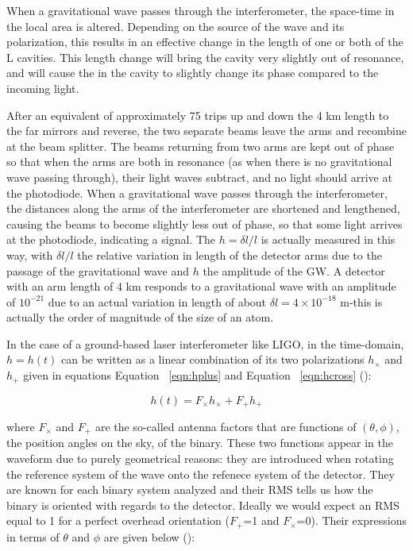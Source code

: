 \documentclass[epsf]{article}
\begin{document}
When a gravitational wave passes through the interferometer, the space-time in the local area is altered. Depending on the source of the wave and its polarization, this results in an effective change in the length of one or both of the L cavities. This length change will bring the cavity very slightly out of resonance, and will cause the in the cavity to slightly change its phase compared to the incoming light.

After an equivalent of approximately 75 trips up and down the 4 km length to the far mirrors and reverse, the two separate beams leave the arms and recombine at the beam splitter. The beams returning from two arms are kept out of phase so that when the arms are both in resonance (as when there is no gravitational wave passing through), their light waves subtract, and no light should arrive at the photodiode. When a gravitational wave passes through the interferometer, the distances along the arms of the interferometer are shortened and lengthened, causing the beams to become slightly less out of phase, so that some light arrives at the photodiode, indicating a signal. The $h = \delta l/l$ is actually measured in this way, with $\delta l/l$ the relative variation in length of the detector arms due to the passage of the gravitational wave and $h$ the amplitude of the GW. A detector with an arm length of 4 km responds to a gravitational wave with an amplitude of $10^{-21}$ due to an actual variation in length of about $\delta l=4 \times 10^{-18}$ m-this is actually the order of magnitude of the size of an atom.

In the case of a ground-based laser interferometer like LIGO, in the time-domain, $h=h(t)$ can be written as a linear combination of its two polarizations $h_{\times}$ and $h_+$ given in equations Equation ~\ref{eqn:hplus} and Equation ~\ref{eqn:hcross} (\cite{ligoweb,LIGOIFO,LLOweb,LHOweb,abbott2006,abbott2007,maggiore}):

\begin{equation}
 h(t)=F_{\times}h_{\times}+F_+h_+
\end{equation}

where  $F_{\times}$ and $F_+$ are the so-called antenna factors that are functions of $(\theta, \phi)$, the position angles on the sky, of the binary. These two functions appear in the waveform due to purely geometrical reasons: they are introduced when rotating the reference system of the wave onto the refenece system of the detector. They are known for each binary system analyzed and their RMS tells us how the binary is oriented with regards to the detector. Ideally we would expect an RMS equal to 1 for a perfect overhead orientation ($F_+$=1 and $F_ \times$=0). Their expressions in terms of $\theta$ and $\phi$ are given below (\cite{abbott2006,abbott2007,maggiore}):
\end{document}
